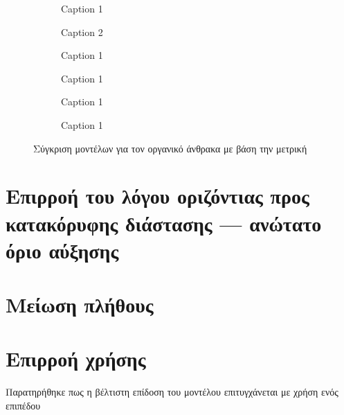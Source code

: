 \begin{figure}[htbp]
    \begin{subfigure}{0.5\textwidth}
        
        \caption{Caption 1}
        \label{fig:subim1}
    \end{subfigure}
    \begin{subfigure}{0.5\textwidth}
        
        \caption{Caption 2}
        \label{fig:subim2}
    \end{subfigure}
    \begin{subfigure}{0.5\textwidth}
        
        \caption{Caption 1}
        \label{fig:subim3}
    \end{subfigure}
    \begin{subfigure}{0.5\textwidth}
        
        \caption{Caption 1}
        \label{fig:subim4}
    \end{subfigure}
    \begin{subfigure}{0.5\textwidth}
        
        \caption{Caption 1}
        \label{fig:subim5}
    \end{subfigure}
    \begin{subfigure}{0.5\textwidth}
        
        \caption{Caption 1}
        \label{fig:subim6}
    \end{subfigure}
    \caption{Σύγκριση μοντέλων για τον οργανικό άνθρακα με βάση την μετρική }
\end{figure}

\section{Επιρροή του λόγου οριζόντιας προς κατακόρυφης διάστασης --- ανώτατο όριο αύξησης}


\section{Μείωση πλήθους }

\section{Επιρροή χρήσης }
Παρατηρήθηκε πως η βέλτιστη επίδοση του μοντέλου επιτυγχάνεται με χρήση ενός επιπέδου  